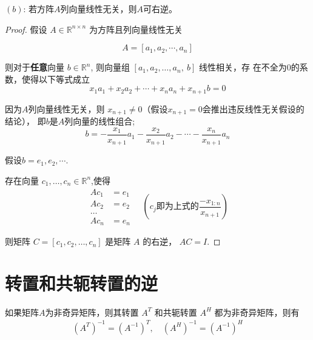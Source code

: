 \begin{theorem}
    $(b)$: 若方阵$A$列向量线性无关，则$A$可右逆。 
\end{theorem}

\begin{proof}
    假设 $ A \in \mathbb{R}^{n \times n} $ 为方阵且列向量线性无关 
    
    \begin{equation} A=\left[a_{1}, a_{2}, \cdots, a_{n}\right] \end{equation}

    则对于\textbf{任意}向量 $  {b} \in \mathbb{R}^{n} $, 则向量组 $ \left[a_{1}, a_{2}, \ldots, a_{n},  {~b}\right] $ 线性相关，存 在不全为0的系数，使得以下等式成立
    \begin{equation}
    x_{1} a_{1}+x_{2} a_{2}+\cdots+x_{n} a_{n}+x_{n+1} b=0
    \end{equation}

    因为$A$列向量线性无关，则 $ x_{n+1} \neq 0 $（假设$ x_{n+1} = 0 $会推出违反线性无关假设的结论）， 即$b$是$A$列向量的线性组合;
    \begin{equation}
    b=-\frac{x_{1}}{x_{n+1}} a_{1}-\frac{x_{2}}{x_{n+1}} a_{2}-\cdots-\frac{x_{n}}{x_{n+1}} a_{n}
    \end{equation}

    假设$b = e_1, e_2 , \cdots$.

    存在向量 $ c_{1}, \ldots, c_{n} \in \mathbb{R}^{n} $,使得 
    \begin{equation}
    \begin{aligned}
        Ac _{1}&=e_{1}\\
         A c_{2}&=e_{2}\\
          \ldots \\
          A c_{n}&=e_{n}
    \end{aligned}
    \quad (c_j即为上式的 \frac{-x_{1:n}}{x_{n+1}})
    \end{equation}


    则矩阵 $ C=\left[c_{1}, c_{2}, \ldots,c_{n}\right] $ 是矩阵 $ A $ 的右逆， $ A C=I $.

\end{proof}

\section{转置和共轭转置的逆}

\begin{theorem}[转置 $ A^{T} $ 和共轭转置 $ A^{ {H}} $ ]
    如果矩阵$A$为非奇异矩阵，则其转置 $ A^{T} $ 和共轭转置 $ A^{ {H}} $ 都为非奇异矩阵，则有
\begin{equation}
\begin{array}{l}
\left(A^{T}\right)^{-1}=\left(A^{-1}\right)^{T}, \quad\left(A^{H}\right)^{-1}=\left(A^{-1}\right)^{H} \\
\end{array}
\end{equation}
\end{theorem}

